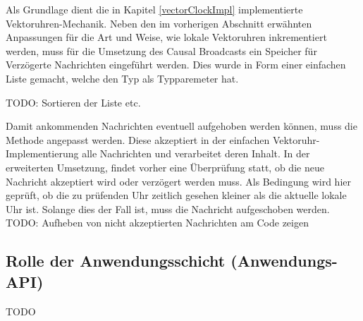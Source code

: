 Als Grundlage dient die in Kapitel \ref{vectorClockImpl} implementierte Vektoruhren-Mechanik. Neben den im vorherigen Abschnitt erwähnten Anpassungen für die Art und Weise, wie lokale Vektoruhren inkrementiert werden, muss für die Umsetzung des Causal Broadcasts ein Speicher für Verzögerte Nachrichten eingeführt werden. Dies wurde in Form einer einfachen Liste gemacht, welche den Typ  als Typparemeter hat.  

TODO: Sortieren der Liste etc.

Damit ankommenden Nachrichten eventuell aufgehoben werden können, muss die Methode  angepasst werden. Diese akzeptiert in der einfachen Vektoruhr-Implementierung alle Nachrichten und verarbeitet deren Inhalt. In der erweiterten Umsetzung,  findet vorher eine Überprüfung statt, ob die neue Nachricht akzeptiert wird oder verzögert werden muss. Als Bedingung wird hier geprüft, ob die zu prüfenden Uhr zeitlich gesehen kleiner als die aktuelle lokale Uhr ist. Solange dies der Fall ist, muss die Nachricht aufgeschoben werden. 
TODO: Aufheben von nicht akzeptierten Nachrichten am Code zeigen
 
\subsection{Rolle der Anwendungsschicht (Anwendungs-API)}
TODO
\label{RolleDerAnwendung}
